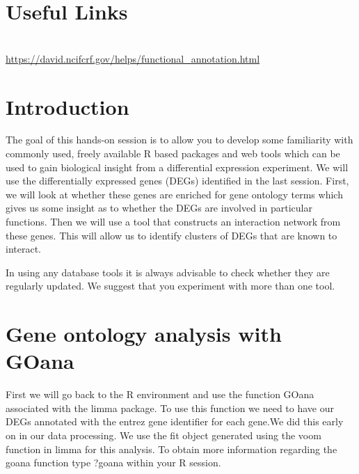 \section{Useful Links}
 
\begin{description}[style=multiline,labelindent=0cm,align=left,leftmargin=0.5cm]
  \item[FASTQ Encoding]\hfill\\
    \url{https://david.ncifcrf.gov/helps/functional_annotation.html}
\end{description}

\newpage

\section{Introduction}


The goal of this hands-on session is to allow you to develop some familiarity with commonly used, freely available R based packages and web tools which can be used to gain biological insight from a differential expression experiment. 
We will use the differentially expressed genes (DEGs) identified in the last session.  
First, we will look at whether these genes are enriched for gene ontology terms which gives us some insight as to whether the DEGs are involved in particular functions. Then we will use a tool that constructs an interaction network from these genes. This will allow us to identify clusters of DEGs that are known to interact.  

\begin{note}In using any database tools it is always advisable to check whether they are regularly updated. We suggest that you experiment with more than one tool.
\end{note}

\section{Gene ontology analysis with GOana}
First we will go back to the R environment and use the function GOana associated with the limma package.  To use this function we need to have our DEGs annotated with the entrez gene identifier for each gene.We did this early on in our data processing. We use the fit object generated using the voom function in limma for this analysis. To obtain more information regarding the goana function type ?goana within your R session.

